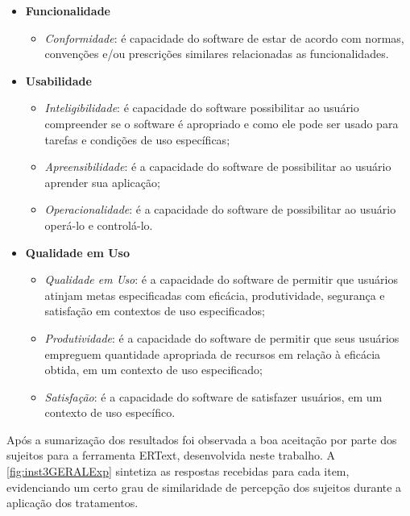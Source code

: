 \begin{itemize}
    
    \item \textbf{Funcionalidade} 
        \begin{itemize}
            \item \textit{Conformidade}: é capacidade do software de estar de acordo com normas, convenções e/ou prescrições similares relacionadas as funcionalidades.
        \end{itemize}
    
    \item \textbf{Usabilidade}
        \begin{itemize}
            \item \textit{Inteligibilidade}: é capacidade do software possibilitar ao usuário compreender se o software é apropriado e como ele pode ser usado para tarefas e condições de uso específicas;
            \item \textit{Apreensibilidade}: é a capacidade do software de possibilitar ao usuário aprender sua aplicação;
            \item \textit{Operacionalidade}: é a capacidade do software de possibilitar ao usuário operá-lo e controlá-lo.
        \end{itemize}
    
    \item \textbf{Qualidade em Uso}
        \begin{itemize}
            \item \textit{Qualidade em Uso}: é a capacidade do software de permitir que usuários atinjam metas especificadas com eficácia, produtividade, segurança e satisfação em contextos de uso especificados;
            \item \textit{Produtividade}: é a capacidade do software de permitir que seus usuários empreguem quantidade apropriada de recursos em relação à eficácia obtida, em um contexto de uso especificado;
            \item \textit{Satisfação}: é a capacidade do software de satisfazer usuários, em um contexto de uso específico.
        \end{itemize}
\end{itemize}

Após a sumarização dos resultados foi observada a boa aceitação por parte dos sujeitos para a ferramenta ERText, desenvolvida neste trabalho. 
A \autoref{fig:inst3GERALExp} sintetiza as respostas recebidas para cada item, evidenciando um certo grau de similaridade de percepção dos sujeitos durante a aplicação dos tratamentos.

